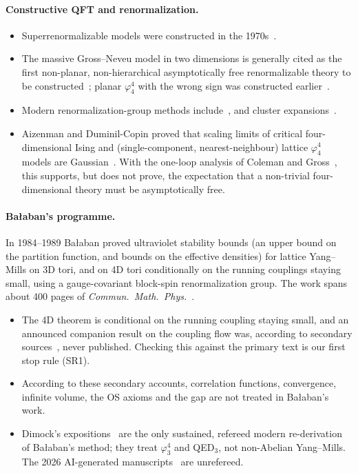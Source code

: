 \documentclass[11pt]{article}
\theoremstyle{definition}
\theoremstyle{remark}
\begin{document}
\paragraph{Constructive QFT and renormalization.}
\begin{itemize}[leftmargin=*]
\item Superrenormalizable models were constructed in the 1970s~\cite{Glimm1987,Feldman1976}.
\item The massive Gross--Neveu model in two dimensions is generally cited as the first non-planar,
  non-hierarchical asymptotically free renormalizable theory to be
  constructed~\cite{Gawedzki1985a,Feldman1986}; planar $\varphi^4_4$ with the wrong sign was
  constructed earlier~\cite{Hooft1983,Rivasseau1984}.
\item Modern renormalization-group methods include~\cite{Bauerschmidt2019,Brydges2015a}, and
  cluster expansions~\cite{Kotecky1986}.
\item Aizenman and Duminil-Copin proved that scaling limits of critical four-dimensional Ising and
  (single-component, nearest-neighbour) lattice $\varphi^4_4$ models are Gaussian~\cite{Aizenman2021}.
  With the one-loop analysis of Coleman and Gross~\cite{Coleman1973}, this supports, but does not
  prove, the expectation that a non-trivial four-dimensional theory must be asymptotically free.
\end{itemize}

\paragraph{Ba{\l}aban's programme.}
In 1984--1989 Ba{\l}aban proved ultraviolet stability bounds (an upper bound on the partition
function, and bounds on the effective densities) for lattice Yang--Mills on 3D tori, and on 4D tori
conditionally on the running couplings staying small, using a gauge-covariant block-spin
renormalization group. The work spans about 400 pages of
\emph{Commun.\ Math.\ Phys.}~\cite{Balaban1984a,Balaban1984b,Balaban1985a,Balaban1985c,Balaban1985e,Balaban1985f,Balaban1985g,Balaban1987,Balaban1988b,Balaban1988d,Balaban1989b,Balaban1989c}.
\begin{itemize}[leftmargin=*]
\item The 4D theorem is conditional on the running coupling staying small, and an announced
  companion result on the coupling flow was, according to secondary sources~\cite{Dimock2013a}, never
  published.
  Checking this against the primary text is our first stop rule (SR1).
\item According to these secondary accounts, correlation functions, convergence, infinite volume,
  the OS axioms and the gap are not treated in Ba{\l}aban's work.
\item Dimock's expositions~\cite{Dimock2013a,Dimock2013b,Dimock2013c,Dimock2014,Dimock2022} are the
  only sustained, refereed modern re-derivation of Ba{\l}aban's method; they treat $\varphi^4_3$ and
  QED$_3$, not non-Abelian Yang--Mills. The 2026 AI-generated manuscripts~\cite{Sussman2026,Aronow2026}
  are unrefereed.
\end{itemize}
\end{document}
